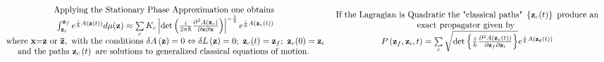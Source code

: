 \documentclass{amsart}
\begin{document}
\[
\begin{array}{c}
 \mbox{Applying the Stationary Phase Approximation one obtains } \\
 \int_{{\rm {\bf z}}_i }^{{\rm {\bf z}}_f } {e^{\frac{i}{\hbar }A\left(
{{\rm {\bf z}}(t)} \right)}d\mu ({\rm {\bf z}})} \approx \sum\limits_c {K_c
\left| {\det \left( {\frac{i}{2\pi \hbar }\frac{\partial ^2A\left( {{\rm
{\bf z}}_c } \right)}{\partial {\rm {\bf x}}\partial {\rm {\bf x}}}}
\right)} \right|^{-\frac{1}{2}}e^{\frac{i}{\hbar }A\left( {{\rm {\bf z}}_c
(t)} \right)}} \\
 \mbox{where }{\rm {\bf x}}\mbox{=}{\rm {\bf z}}\mbox{ or }{\rm {\bf \bar
{z}}},\mbox{ with the conditions }\delta A\left( {\rm {\bf z}}
\right)=0\Leftrightarrow \delta L\left( {\rm {\bf z}} \right)=0;\mbox{ }{\rm
{\bf z}}_c (t)={\rm {\bf z}}_f ;\mbox{ }{\rm {\bf z}}_c (0)={\rm {\bf z}}_i
\\
 \mbox{and the paths }{\rm {\bf z}}_c \left( t \right)\mbox{ are solutions
to generalized classical equations of motion. } \\
 \end{array}
\begin{array}{c}
 \mbox{ If the Lagragian is Quadratic the "classical paths" }\left\{ {{\rm
{\bf z}}_c (t)} \right\}\mbox{ produce an } \\
 \mbox{exact propagator given by } \\
 P\left( {{\rm {\bf z}}_f ,{\rm {\bf z}}_i ,t} \right)=\sum\limits_c {\sqrt
{\det \left\{ {\frac{i}{h}\frac{\partial ^2A({\rm {\bf z}}_c (t))}{\partial
{\rm {\bf z}}_f \partial {\rm {\bf z}}_i }} \right\}} } e^{\frac{i}{\hbar
}A\left( {{\rm {\bf z}}_{\rm {\bf c}} \left( t \right)} \right)} \\
 \end{array}
\]
\end{document}
